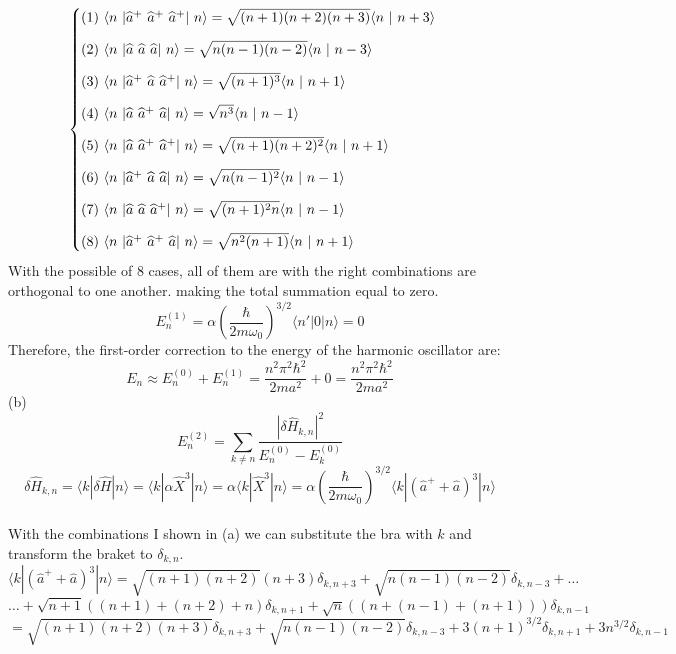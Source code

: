 \documentclass[11pt]{article}
\def\h{\hbar}
\def\w{\omega}
\def\la{\langle}
\def\ra{\rangle}
\def\sp{\vspace{3mm}}
\renewcommand{\hat}{\widehat}
\theoremstyle{pink}
\theoremstyle{boxedsolution}
\theoremstyle{definition}
\theoremstyle{claim}
\begin{document}
\[
\begin{cases}
(1) \text{ } \la n\text{ }|\hat{a}^{+}\text{ }\hat{a}^{+}\text{ }\hat{a}^{+}|\text{ }n\ra=\sqrt{(n+1)(n+2)(n+3)}\la n\text{ }|\text{ }n+3\ra
\sp
\\(2) \text{ } \la n\text{ }|\hat{a}\text{ }\hat{a}\text{ }\hat{a}|\text{ }n\ra=\sqrt{n(n-1)(n-2)}\la n\text{ }|\text{ }n-3\ra
\sp
\\(3)  \text{ } \la n\text{ }|\hat{a}^{+}\text{ }\hat{a}\text{ }\hat{a}^{+}|\text{ }n\ra=\sqrt{(n+1)^3}\la n\text{ }|\text{ }n+1\ra
\sp
\\(4)   \text{ } \la n\text{ }|\hat{a}\text{ }\hat{a}^{+}\text{ }\hat{a}|\text{ }n\ra=\sqrt{n^3}\la n\text{ }|\text{ }n-1\ra
\sp
\\(5)   \text{ } \la n\text{ }|\hat{a}\text{ }\hat{a}^{+}\text{ }\hat{a}^{+}|\text{ }n\ra=\sqrt{(n+1)(n+2)^2}\la n\text{ }|\text{ }n+1\ra
\sp
\\(6)   \text{ } \la n\text{ }|\hat{a}^{+}\text{ }\hat{a}\text{ }\hat{a}|\text{ }n\ra=\sqrt{n(n-1)^2}\la n\text{ }|\text{ }n-1\ra
\sp
\\(7)   \text{ } \la n\text{ }|\hat{a}\text{ }\hat{a}\text{ }\hat{a}^{+}|\text{ }n\ra=\sqrt{(n+1)^2n}\la n\text{ }|\text{ }n-1\ra
\sp
\\(8)   \text{ } \la n\text{ }|\hat{a}^{+}\text{ }\hat{a}^{+}\text{ }\hat{a}|\text{ }n\ra=\sqrt{n^2(n+1)}\la n\text{ }|\text{ }n+1\ra
\end{cases}\]
With the possible of 8 cases, all of them are with the right combinations are orthogonal to one another. making the total summation equal to zero.
\sp
\[E_n^{(1)}=\alpha\left(\frac{\h}{2m\w_0}\right)^{3/2}\la n'| 0 | n \ra = 0\]
Therefore, the first-order correction to the energy of the harmonic oscillator are:
\sp
\[E_n\approx E_n^{(0)}+E_n^{(1)}=\frac{n^2\pi^2\h^2}{2ma^2}+0=\frac{n^2\pi^2\h^2}{2ma^2}\]
(b)
\[E_n^{(2)}=\sum_{k\neq n}\frac{| \delta \hat{H}_{k,n}|^2}{E^{(0)}_n-E^{(0)}_k}\]
\sp
\[
\delta \hat{H}_{k,n}=\la k|\delta\hat{H}| n\ra= \la k|\alpha \hat{X}^3| n\ra= \alpha\la k|\hat{X}^3| n\ra=
\alpha\left(\frac{\h}{2m\w_0}\right)^{3/2}\la k|\left(\hat{a}^++\hat{a}\right)^3| n\ra
\]
\sp
\\With the combinations I shown in (a) we can substitute the bra with $k$ and transform the braket to $\delta_{k,n}$.
\sp
\[\la k|\left(\hat{a}^++\hat{a}\right)^3| n\ra = \sqrt{(n+1)(n+2)}(n+3)\delta_{k,n+3} + \sqrt{n(n-1)(n-2)}\delta_{k,n-3}+
\dots\]
\sp
\[\dots + \sqrt{n+1}((n+1)+(n+2)+n)\delta_{k,n+1}+\sqrt{n}((n+(n-1)+(n+1)))\delta_{k,n-1}\]
\sp
\[=\sqrt{(n+1)(n+2)(n+3)}\delta_{k,n+3} + 
\sqrt{n(n-1)(n-2)}\delta_{k,n-3}+
3(n+1)^{3/2}\delta_{k,n+1}+
3n^{3/2}\delta_{k,n-1}\]
\end{document}

